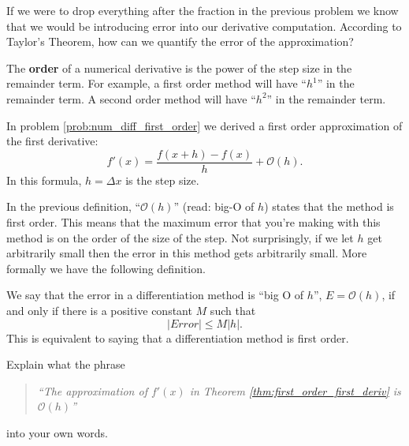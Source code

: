 \begin{problem}
    If we were to drop everything after the fraction in the previous problem we know that
    we would be introducing error into our derivative computation.  According to Taylor's
    Theorem, how can we quantify the error of the approximation?
\end{problem}

\begin{definition}
    The {\bf order} of a numerical derivative is the power of the step size in the
    remainder term.  For example, a first order method will have ``$h^1$'' in the
    remainder term.  A second order method will have ``$h^2$'' in the remainder term.
\end{definition}

\begin{thm}\label{thm:first_order_first_deriv}
    In problem \ref{prob:num_diff_first_order} we derived a first order approximation of
    the first derivative:
    \[ f'(x) = \frac{f(x+h) - f(x)}{h} + \mathcal{O}(h). \]
    In this formula, $h = \Delta x$ is the step size.
\end{thm}
In the previous definition, ``$\mathcal{O}(h)$'' (read: big-O of $h$) states that the
method is first order.  This means that the maximum error that you're making with this
method is on the order of the size of the step.  Not surprisingly, if we let $h$ get
arbitrarily small then the error in this method gets arbitrarily small.  More formally we
have the following definition.

\begin{definition}
    We say that the error in a differentiation method is ``big O of $h$'', $E =
    \mathcal{O}(h)$, if and only if there is a positive constant $M$ such that 
    \[ |Error| \le M |h|. \]
    This is equivalent to saying that a differentiation method is first order.
\end{definition}

\begin{problem}
    Explain what the phrase
    \begin{quote}
        {\it ``The approximation of $f'(x)$ in Theorem \ref{thm:first_order_first_deriv} is $\mathcal{O}(h)$''}
    \end{quote}
    into your own words.  
\end{problem}


